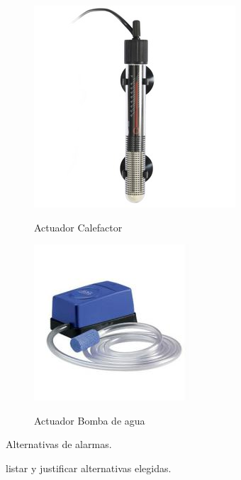 \begin{figure}[h]
	\centering
    \includegraphics[width=.5\textwidth]{./Figures/actuador_heater}
	\label{fig:act_heater}
	\caption{Actuador Calefactor}
\end{figure}

\begin{figure}[h]
	\centering
    \includegraphics[width=.5\textwidth]{./Figures/actuador_pump}
	\label{fig:act_pump}
	\caption{Actuador Bomba de agua}
\end{figure}

Alternativas de alarmas.

listar y justificar alternativas elegidas.